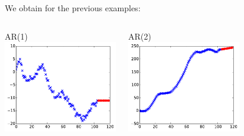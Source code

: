 \documentclass{beamer}
\begin{document}
\begin{frame}{}
We obtain for the previous examples:
\vspace{5mm}
\begin{columns}[c]
\column{5cm}
\begin{center}
AR(1)\\
\includegraphics[height=4cm]{figures/1_ar1pred}
\end{center}
\column{5cm}
\begin{center}
AR(2)\\
\includegraphics[height=4cm]{figures/1_ar2pred}
\end{center}
\end{columns}
\end{frame}
\end{document}
